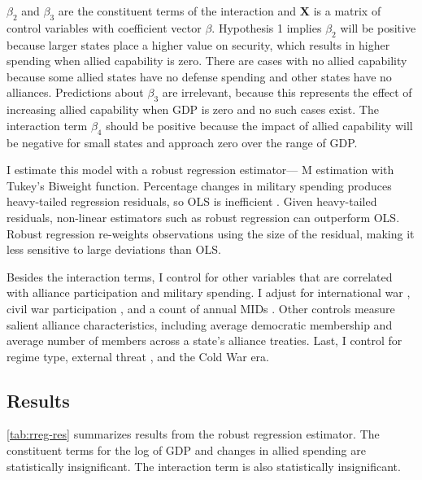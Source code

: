 \documentclass[12pt]{article}
\begin{document}
$\beta_2$ and $\beta_3$ are the constituent terms of the interaction and \textbf{X} is a matrix of control variables with coefficient vector $\beta$.
Hypothesis 1 implies $\beta_2$ will be positive because larger states place a higher value on security, which results in higher spending when allied capability is zero.
There are cases with no allied capability because some allied states have no defense spending and other states have no alliances.  
Predictions about $\beta_3$ are irrelevant, because this represents the effect of increasing allied capability when GDP is zero and no such cases exist. 
The interaction term $\beta_4$ should be positive because the impact of allied capability will be negative for small states and approach zero over the range of GDP. 


I estimate this model with a robust regression estimator--- M estimation with Tukey's Biweight function. 
Percentage changes in military spending produces heavy-tailed regression residuals, so OLS is inefficient \citep{RaineyBaissa2018}. 
Given heavy-tailed residuals, non-linear estimators such as robust regression can outperform OLS. 
Robust regression re-weights observations using the size of the residual, making it less sensitive to large deviations than OLS. 


Besides the interaction terms, I control for other variables that are correlated with alliance participation and military spending. 
I adjust for international war \citep{Reiteretal2016}, civil war participation \citep{SarkeesWayman2010}, and a count of annual MIDs \citep{Gibleretal2016}. 
Other controls measure salient alliance characteristics, including average democratic membership \citep{DigiuseppePoast2016} and average number of members across a state's alliance treaties.   
Last, I control for regime type, external threat \citep{LeedsSavun2007}, and the Cold War era. 


\subsection{Results}

 
\autoref{tab:rreg-res} summarizes results from the robust regression estimator. 
The constituent terms for the log of GDP and changes in allied spending are statistically insignificant. 
The interaction term is also statistically insignificant. 
\end{document}
